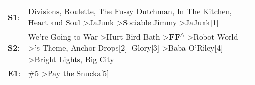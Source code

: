 \begin{supertabular}{p{0.03\textwidth}p{0.92\textwidth}}
 \textbf{S1}:  &                                                                                                            Divisions\textsuperscript{}, \enspace Roulette\textsuperscript{}, \enspace The Fussy Dutchman\textsuperscript{}, \enspace In The Kitchen\textsuperscript{}, \enspace Heart and Soul\textsuperscript{} \textgreater \enspace JaJunk\textsuperscript{} \textgreater \enspace Sociable Jimmy\textsuperscript{} \textgreater \enspace JaJunk[1]\textsuperscript{}  \enspace  \\
 \textbf{S2}:  &  We're Going to War\textsuperscript{} \textgreater \enspace Hurt Bird Bath\textsuperscript{} \textgreater \enspace \textbf{FF\textsuperscript{$\wedge$}} \textgreater \enspace Robot World\textsuperscript{} \textgreater {}'s Theme\textsuperscript{}, \enspace Anchor Drops[2]\textsuperscript{}, \enspace Glory[3]\textsuperscript{} \textgreater \enspace Baba O'Riley[4]\textsuperscript{} \textgreater \enspace Bright Lights, Big City\textsuperscript{}  \enspace  \\
 \textbf{E1}:  &                                                                                                                                                                                                                                                                                                                                                                                          \#5\textsuperscript{} \textgreater \enspace Pay the Snucka[5]\textsuperscript{}  \enspace  \\
\end{supertabular}
